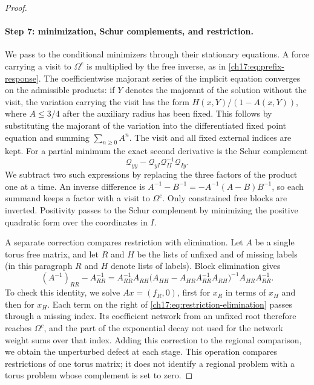 \begin{proof}
\paragraph{Step 7: minimization, Schur complements, and restriction.}
We pass to the conditional minimizers through their stationary equations. A force carrying a visit to $\Omega^c$ is multiplied by the free inverse, as in \eqref{ch17:eq:prefix-response}. The coefficientwise majorant series of the implicit equation converges on the admissible products: if $Y$ denotes the majorant of the solution without the visit, the variation carrying the visit has the form $H(x,Y)/(1-A(x,Y))$, where $A\le3/4$ after the auxiliary radius has been fixed. This follows by substituting the majorant of the variation into the differentiated fixed point equation and summing $\sum_{n\ge0}A^n$. The visit and all fixed external indices are kept. For a partial minimum the exact second derivative is the Schur complement
\begin{equation}\label{ch17:eq:schur-hessian}
 \mathcal Q_{yy}-\mathcal Q_{yI}\mathcal Q_{II}^{-1}\mathcal Q_{Iy}.
\end{equation}
We subtract two such expressions by replacing the three factors of the product one at a time. An inverse difference is $A^{-1}-B^{-1}=-A^{-1}(A-B)B^{-1}$, so each summand keeps a factor with a visit to $\Omega^c$. Only constrained free blocks are inverted. Positivity passes to the Schur complement by minimizing the positive quadratic form over the coordinates in $I$.

A separate correction compares restriction with elimination. Let $A$ be a single torus free matrix, and let $R$ and $H$ be the lists of unfixed and of missing labels (in this paragraph $R$ and $H$ denote lists of labels). Block elimination gives
\begin{equation}\label{ch17:eq:restriction-elimination}
 (A^{-1})_{RR}-A_{RR}^{-1}=A_{RR}^{-1}A_{RH}\bigl(A_{HH}-A_{HR}A_{RR}^{-1}A_{RH}\bigr)^{-1}A_{HR}A_{RR}^{-1}.
\end{equation}
To check this identity, we solve $Ax=(f_{R},0)$, first for $x_{R}$ in terms of $x_{H}$ and then for $x_{H}$. Each term on the right of \eqref{ch17:eq:restriction-elimination} passes through a missing index. Its coefficient network from an unfixed root therefore reaches $\Omega^c$, and the part of the exponential decay not used for the network weight sums over that index. Adding this correction to the regional comparison, we obtain the unperturbed defect at each stage. This operation compares restrictions of one torus matrix; it does not identify a regional problem with a torus problem whose complement is set to zero.


\end{proof}

